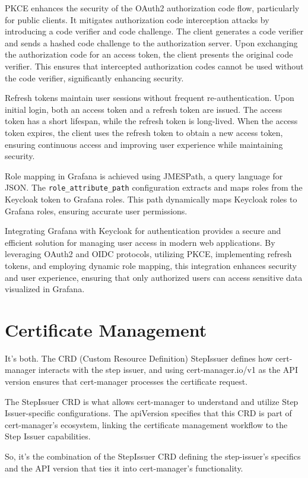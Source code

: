 PKCE enhances the security of the OAuth2 authorization code flow, particularly for public clients. It mitigates authorization code interception attacks by introducing a code verifier and code challenge. The client generates a code verifier and sends a hashed code challenge to the authorization server. Upon exchanging the authorization code for an access token, the client presents the original code verifier. This ensures that intercepted authorization codes cannot be used without the code verifier, significantly enhancing security.

Refresh tokens maintain user sessions without frequent re-authentication. Upon initial login, both an access token and a refresh token are issued. The access token has a short lifespan, while the refresh token is long-lived. When the access token expires, the client uses the refresh token to obtain a new access token, ensuring continuous access and improving user experience while maintaining security.

Role mapping in Grafana is achieved using JMESPath, a query language for JSON. The \texttt{role\_attribute\_path} configuration extracts and maps roles from the Keycloak token to Grafana roles. This path dynamically maps Keycloak roles to Grafana roles, ensuring accurate user permissions.

Integrating Grafana with Keycloak for authentication provides a secure and efficient solution for managing user access in modern web applications. By leveraging OAuth2 and OIDC protocols, utilizing PKCE, implementing refresh tokens, and employing dynamic role mapping, this integration enhances security and user experience, ensuring that only authorized users can access sensitive data visualized in Grafana.


\chapter{Certificate Management}

It’s both. The CRD (Custom Resource Definition) StepIssuer defines how cert-manager interacts with the step issuer, and using cert-manager.io/v1 as the API version ensures that cert-manager processes the certificate request.

The StepIssuer CRD is what allows cert-manager to understand and utilize Step Issuer-specific configurations. The apiVersion specifies that this CRD is part of cert-manager’s ecosystem, linking the certificate management workflow to the Step Issuer capabilities.

So, it’s the combination of the StepIssuer CRD defining the step-issuer's specifics and the API version that ties it into cert-manager’s functionality.